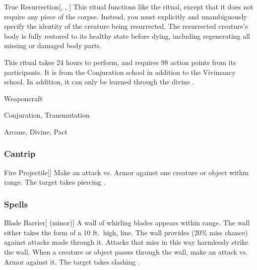 \lowercase{\hypertarget{spell:True Resurrection}{}}\label{spell:True Resurrection}
\begin{apability}[\nth{7}]{\hypertarget{spell:True Resurrection}{True Resurrection}}[, , ]
This ritual functions like the  ritual, except that it does not require any piece of the corpse.
Instead, you must explicitly and unambiguously specify the identity of the creature being resurrected.
The resurrected creature's body is fully restored to its healthy state before dying, including regenerating all missing or damaged body parts.

This ritual takes 24 hours to perform, and requires 98 action points from its participants.
It is from the Conjuration school in addition to the Vivimancy school.
In addition, it can only be learned through the divine .
\end{apability}
\vspace{0.25em}


\newpage
\begin{spellsection}{Weaponcraft}

\begin{spellheader}
\end{spellheader}


 Conjuration, Transmutation

 Arcane, Divine, Pact

\subsubsection{Cantrip}


\begin{freeability}{Fire Projectile}[]
Make an attack vs. Armor against one creature or object within \rngmed range.
\hit The target takes piercing .
\end{freeability}

\end{spellsection}


\subsubsection{Spells}


\lowercase{\hypertarget{spell:Blade Barrier}{}}\label{spell:Blade Barrier}
\begin{apability}[\nth{1}]{\hypertarget{spell:Blade Barrier}{Blade Barrier}}[ (minor)]
A wall of whirling blades appears within \rngmed range.
The wall either takes the form of a 10 ft.\ high, \arealarge line.
The wall provides  (20\% miss chance) against attacks made through it.
Attacks that miss in this way harmlessly strike the wall.
When a creature or object passes through the wall, make an attack vs. Armor against it.
\hit The target takes slashing .
\end{apability}
\vspace{0.25em}



